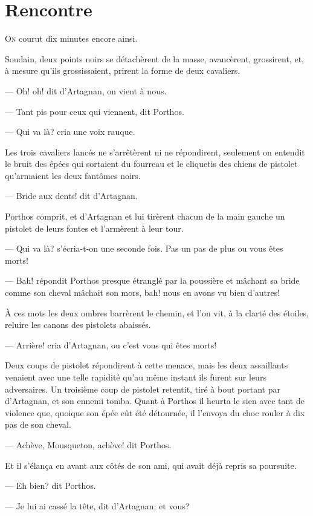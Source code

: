 \chapter{Rencontre}

\lettrine{O}{n} courut dix minutes encore ainsi.

\zz
Soudain, deux points noirs se détachèrent de la masse, avancèrent, grossirent, et, à mesure qu'ils grossissaient, prirent la forme de deux cavaliers.

\zz
— Oh! oh! dit d'Artagnan, on vient à nous.

— Tant pis pour ceux qui viennent, dit Porthos.

— Qui va là? cria une voix rauque.

Les trois cavaliers lancés ne s'arrêtèrent ni ne répondirent, seulement on entendit le bruit des épées qui sortaient du fourreau et le cliquetis des chiens de pistolet qu'armaient les deux fantômes noirs.

— Bride aux dents! dit d'Artagnan.

Porthos comprit, et d'Artagnan et lui tirèrent chacun de la main gauche un pistolet de leurs fontes et l'armèrent à leur tour.

— Qui va là? s'écria-t-on une seconde fois. Pas un pas de plus ou vous êtes morts!

— Bah! répondit Porthos presque étranglé par la poussière et mâchant sa bride comme son cheval mâchait son mors, bah! nous en avons vu bien d'autres!

À ces mots les deux ombres barrèrent le chemin, et l'on vit, à la clarté des étoiles, reluire les canons des pistolets abaissés.

— Arrière! cria d'Artagnan, ou c'est vous qui êtes morts!

Deux coups de pistolet répondirent à cette menace, mais les deux assaillants venaient avec une telle rapidité qu'au même instant ils furent sur leurs adversaires. Un troisième coup de pistolet retentit, tiré à bout portant par d'Artagnan, et son ennemi tomba. Quant à Porthos il heurta le sien avec tant de violence que, quoique son épée eût été détournée, il l'envoya du choc rouler à dix pas de son cheval.

— Achève, Mousqueton, achève! dit Porthos.

Et il s'élança en avant aux côtés de son ami, qui avait déjà repris sa poursuite.

— Eh bien? dit Porthos.

— Je lui ai cassé la tête, dit d'Artagnan; et vous?


